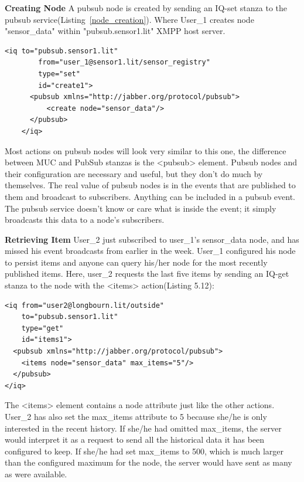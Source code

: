 	\textbf{Creating Node}
	\newline
	A pubsub node is created by sending an IQ-set stanza to the pubsub service(Listing~\ref{node_creation}). Where User\_1 creates node "sensor\_data" within "pubsub.sensor1.lit" XMPP host server.
		\begin{lstlisting}[label=node_creation,caption=PubSub Node Creation]
	<iq to="pubsub.sensor1.lit"
	    from="user_1@sensor1.lit/sensor_registry"
	    type="set"
	    id="create1">
	  <pubsub xmlns="http://jabber.org/protocol/pubsub">
	      <create node="sensor_data"/>
	  </pubsub>
	</iq>
		\end{lstlisting}
	Most actions on pubsub nodes will look very similar to this one, the difference between MUC and PubSub stanzas is the <pubsub> element. Pubsub nodes and their configuration are necessary and useful, but they don't do much by themselves. The real value of pubsub nodes is in the events that are published to them and broadcast to subscribers. Anything can be included in a pubsub event. The pubsub service doesn’t know or care what is inside the event; it simply broadcasts this data to a node’s subscribers.

\textbf{Retrieving Item}
User\_2 just subscribed to user\_1's sensor\_data node, and has missed his event broadcasts from earlier in the week.  User\_1 configured his node to persist items and anyone can query his/her node for the most recently published items. Here, user\_2 requests the last five items by sending an IQ-get stanza to the node with the <items> action(Listing 5.12):
\begin{lstlisting}[label=node_creation_example,caption=PubSub Node Creation]
<iq from="user2@longbourn.lit/outside"
    to="pubsub.sensor1.lit"
    type="get"
    id="items1">
  <pubsub xmlns="http://jabber.org/protocol/pubsub">
    <items node="sensor_data" max_items="5"/>
  </pubsub>
</iq>
\end{lstlisting}
The <items> element contains a node attribute just like the other actions. User\_2 has also set the max\_items attribute to 5 because she/he is only interested in the recent history. If she/he had omitted max\_items, the server would interpret it as a request to send all the historical data it has been configured to keep. If she/he had set max\_items to 500, which is much larger than the configured maximum for the node, the server would have sent as many as were available.

